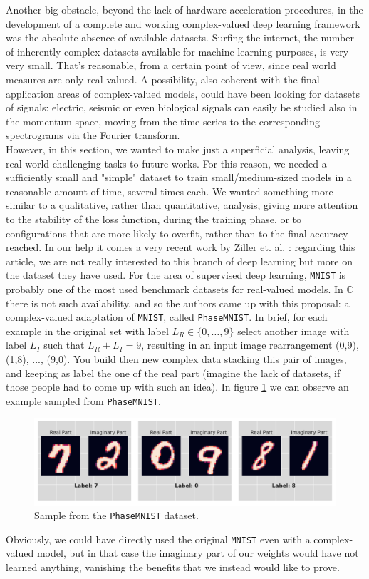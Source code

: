 \documentclass[../main.tex]{subfiles}
\begin{document}
Another big obstacle, beyond the lack of hardware acceleration procedures, in the development of a complete and working complex-valued deep learning framework was the absolute absence of available datasets. Surfing the internet, the number of inherently complex datasets available for machine learning purposes, is very very small. That's reasonable, from a certain point of view, since real world measures are only real-valued. A possibility, also coherent with the final application areas of complex-valued models, could have been looking for datasets of signals: electric, seismic or even biological signals can easily be studied also in the momentum space, moving from the time series to the corresponding spectrograms via the Fourier transform.\\
However, in this section, we wanted to make just a superficial analysis, leaving real-world challenging tasks to future works. For this reason, we needed a sufficiently small and "simple" dataset to train small/medium-sized models in a reasonable amount of time, several times each. We wanted something more similar to a qualitative, rather than quantitative, analysis, giving more attention to the stability of the loss function, during the training phase, or to configurations that are more likely to overfit, rather than to the final accuracy reached.
In our help it comes a very recent work by Ziller et. al. \cite{ziller2021complexvalued}: regarding this article, we are not really interested to this branch of deep learning but more on the dataset they have used. For the area of supervised deep learning, \texttt{MNIST} is probably one of the most used benchmark datasets for real-valued models. In $\mathds{C}$ there is not such availability, and so the authors came up with this proposal: a complex-valued adaptation of \texttt{MNIST}, called \texttt{PhaseMNIST}. In brief, for each example in the original set with label $L_R\in\{0,\dots,9\}$ select another image with label $L_I$ such that $L_R + L_I = 9$, resulting in an input image rearrangement  (0,9), (1,8), ..., (9,0). You build then new complex data stacking this pair of images, and keeping as label the one of the real part (imagine the lack of datasets, if those people had to come up with such an idea). In figure \ref{fig:phasemnist_example} we can observe an example sampled from \texttt{PhaseMNIST}. 
\begin{figure}[!ht]
	\centering
	\includegraphics[width=\textwidth]{pictures/phasemnist_example}
	\caption{Sample from the \texttt{PhaseMNIST} dataset.}
	\label{fig:phasemnist_example}
\end{figure}
Obviously, we could have directly used the original \texttt{MNIST} even with a complex-valued model, but in that case the imaginary part of our weights would have not learned anything, vanishing the benefits that we instead would like to prove.
\end{document}

